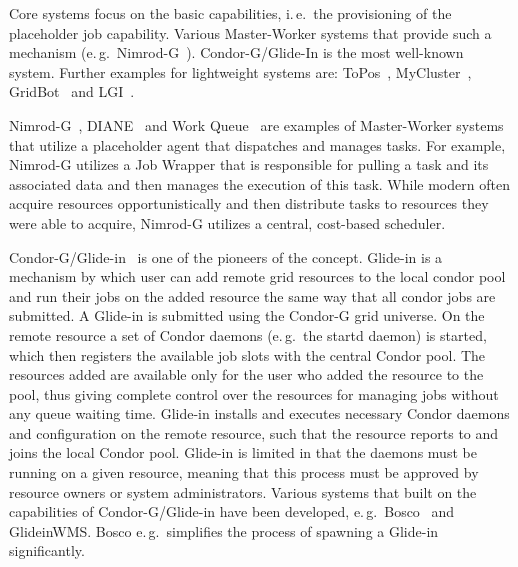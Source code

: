 \documentclass{sig-alternate}
\begin{document}
Core \pilotjob systems focus on the basic \pilot capabilities, i.\,e.\ the
provisioning of the placeholder job capability. Various Master-Worker systems
that provide such a mechanism (e.\,g.\
Nimrod-G~\cite{10.1109/HPC.2000.846563}). Condor-G/Glide-In is the most
well-known \pilotjob system. Further examples for lightweight \pilotjob
systems are: ToPos~\cite{topos},
MyCluster~\cite{Walker:2007:PAC:1285840.1285848},
GridBot~\cite{Silberstein:2009:GEB:1654059.1654071} and LGI~\cite{lgi}.

Nimrod-G~\cite{10.1109/HPC.2000.846563}, DIANE~\cite{diane-thesis} and Work
Queue~\cite{workqueue-pyhpc2011} are examples of Master-Worker systems that
utilize a placeholder agent that dispatches and manages tasks. For example,
Nimrod-G utilizes a Job Wrapper that is responsible for pulling a task and its
associated data and then manages the execution of this task. While modern
\pilotjobs often acquire resources opportunistically and then distribute tasks
to resources they were able to acquire, Nimrod-G utilizes a central,
cost-based scheduler.

Condor-G/Glide-in~\cite{condor-g} is one of the pioneers of the \pilotjob
concept. Glide-in is a mechanism by which user can add remote grid resources
to the local condor pool and run their jobs on the added resource the same way
that all condor jobs are submitted. A Glide-in is submitted using the Condor-G
grid universe. On the remote resource a set of Condor daemons (e.\,g.\ the
startd daemon) is started, which then registers the available job slots with
the central Condor pool. The resources added are available only for the user
who added the resource to the pool, thus giving complete control over the
resources for managing jobs without any queue waiting time. Glide-in installs
and executes necessary Condor daemons and configuration on the remote
resource, such that the resource reports to and joins the local Condor pool.
Glide-in is limited in that the daemons must be running on a given resource,
meaning that this process must be approved by resource owners or system
administrators. Various systems that built on the \pilot capabilities of 
Condor-G/Glide-in have been developed, e.\,g.\ Bosco~\cite{bosco} and 
GlideinWMS. Bosco e.\,g.\ simplifies the process of spawning a Glide-in 
significantly.



\end{document}
